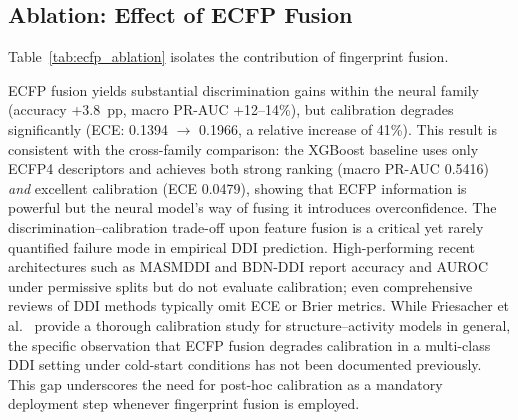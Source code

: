 \documentclass[11pt,a4paper,twocolumn]{article}
\begin{document}
\subsection{Ablation: Effect of ECFP Fusion}
Table~\ref{tab:ecfp_ablation} isolates the contribution of fingerprint fusion.

\begin{table}[tp]
\centering
\caption{Ablation: ECFP fusion under identical logit adjustment and DRW.
         Mean across five folds.}
\label{tab:ecfp_ablation}
\end{table}

ECFP fusion yields substantial discrimination gains within the neural family
(accuracy +3.8~pp, macro PR-AUC +12--14\%), but calibration degrades
significantly (ECE: 0.1394 $\to$ 0.1966, a relative increase of 41\%).
This result is consistent with the cross-family comparison: the XGBoost baseline
uses only ECFP4 descriptors and achieves both strong ranking (macro PR-AUC 0.5416)
\emph{and} excellent calibration (ECE 0.0479), showing that ECFP information is
powerful but the neural model's way of fusing it introduces overconfidence.
The discrimination--calibration trade-off upon feature fusion is a critical yet
rarely quantified failure mode in empirical DDI prediction.
High-performing recent architectures such as MASMDDI \cite{lin2024masmddi} and
BDN-DDI \cite{feng2024bdnddi} report accuracy and AUROC under permissive splits
but do not evaluate calibration; even comprehensive reviews of DDI methods
\cite{daba2025} typically omit ECE or Brier metrics.
While Friesacher et al.\ \cite{friesacher2025calibration} provide a thorough
calibration study for structure--activity models in general, the specific
observation that ECFP fusion degrades calibration in a multi-class DDI setting
under cold-start conditions has not been documented previously.
This gap underscores the need for post-hoc calibration as a mandatory
deployment step whenever fingerprint fusion is employed.
\end{document}

